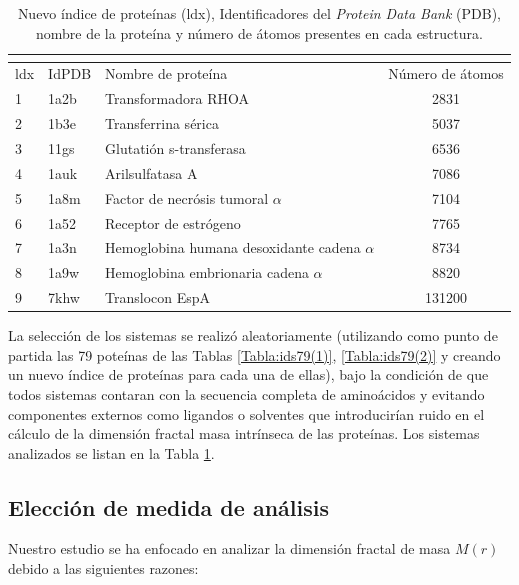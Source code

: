  	\begin{table}[H]
 		\centering
 		\begin{tabular}{||lllc||}
 			\multicolumn{4}{l}{} \\ 
 			\hline
 			ldx & IdPDB & Nombre de prote\'{i}na & N\'{u}mero de \'{a}tomos \\
 			\hline
 			 1  & 1a2b & Transformadora RHOA & 2831 \\
 			 2 & 1b3e & Transferrina s\'{e}rica & 5037 \\
 			 3 & 11gs & Glutati\'{o}n s-transferasa & 6536 \\ 
 			 4 & 1auk & Arilsulfatasa A & 7086 \\
 			 5 & 1a8m & Factor de necr\'{o}sis tumoral $\alpha$ & 7104 \\
 			 6 & 1a52 & Receptor de estr\'{o}geno & 7765 \\
 			 7 & 1a3n & Hemoglobina humana desoxidante cadena $\alpha$ & 8734 \\
 			 8 & 1a9w & Hemoglobina embrionaria cadena $\alpha$ & 8820 \\
 			 9 & 7khw & Translocon EspA & 131200 \\
 			\hline
 		\end{tabular}
 		\caption{Nuevo \'{i}ndice de prote\'{i}nas (ldx), Identificadores del \emph{Protein Data Bank} (PDB), nombre de la prote\'{i}na y n\'{u}mero de \'{a}tomos presentes en cada estructura.}
 		\label{Tabla:ids9}
 	\end{table}
 	
 	
 	
 	La selecci\'{o}n de los sistemas se realiz\'{o} aleatoriamente (utilizando como punto de partida las 79 pote\'{i}nas de las Tablas \ref{Tabla:ids79(1)}, \ref{Tabla:ids79(2)} y creando un nuevo \'{i}ndice de prote\'{i}nas para cada una de ellas), bajo la condici\'{o}n de que todos sistemas contaran con la secuencia completa de amino\'{a}cidos y evitando componentes externos como ligandos o solventes que introducir\'{i}an ruido en el c\'{a}lculo de la dimensi\'{o}n fractal masa intr\'{i}nseca de las prote\'{i}nas. Los sistemas analizados se listan en la Tabla \ref{Tabla:ids9}.
 
	
	\subsection{Elección de medida de análisis}
	\label{eleccionMN}
	
	 Nuestro estudio se ha enfocado en analizar la dimensi\'{o}n fractal de masa $M(r)$ debido a las siguientes razones:  
	 
